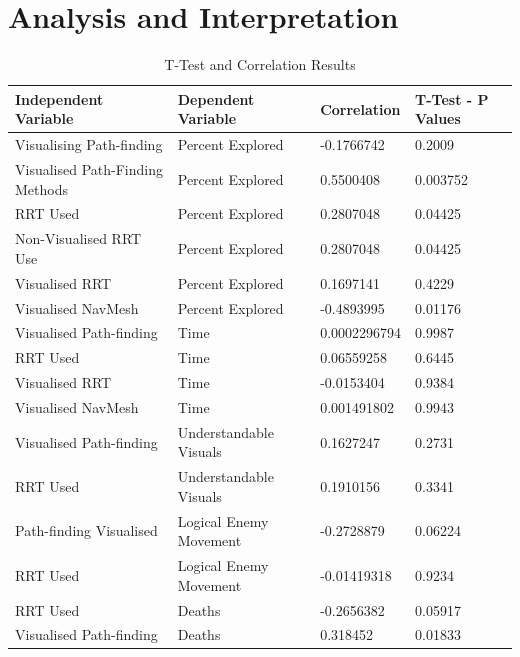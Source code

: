 \documentclass[journal]{IEEEtran}
\begin{document}
	\section{Analysis and Interpretation} \label{Analysis}
	\begin{table}[]
		\centering
		\caption{T-Test and Correlation Results}
		\label{StatsTable}
		\def\arraystretch{1.5}
		\begin{tabular}{|l|l|l|l|}
			\hline
			\textbf{Independent Variable }    &  \textbf{Dependent Variable } & \textbf{Correlation} & \textbf{T-Test - P Values}                   \\ \hline
			Visualising Path-finding& Percent Explored       & -0.1766742   & 0.2009            \\ \hline
			Visualised Path-Finding Methods	& Percent Explored		 & 0.5500408	& 0.003752			\\ \hline
			RRT Used                & Percent Explored       & 0.2807048    & 0.04425           \\ \hline
			Non-Visualised RRT Use  & Percent Explored       & 0.2807048    & 0.04425           \\ \hline
			Visualised RRT          & Percent Explored       & 0.1697141    & 0.4229            \\ \hline
			Visualised NavMesh      & Percent Explored       & -0.4893995   & 0.01176           \\ \hline
			Visualised Path-finding & Time                   & 0.0002296794 & 0.9987            \\ \hline
			RRT Used                & Time                   & 0.06559258   & 0.6445            \\ \hline
			Visualised RRT          & Time                   & -0.0153404   & 0.9384            \\ \hline
			Visualised NavMesh      & Time                   & 0.001491802  & 0.9943            \\ \hline
			Visualised Path-finding & Understandable Visuals & 0.1627247    & 0.2731            \\ \hline
			RRT Used                & Understandable Visuals & 0.1910156    & 0.3341            \\ \hline
			Path-finding Visualised & Logical Enemy Movement & -0.2728879   & 0.06224           \\ \hline
			RRT Used                & Logical Enemy Movement & -0.01419318  & 0.9234            \\ \hline
			RRT Used				& Deaths				 & -0.2656382	& 0.05917			\\ \hline
			Visualised Path-finding & Deaths				 & 0.318452		& 0.01833			\\ \hline
		\end{tabular}
	\end{table}
	
\end{document}
